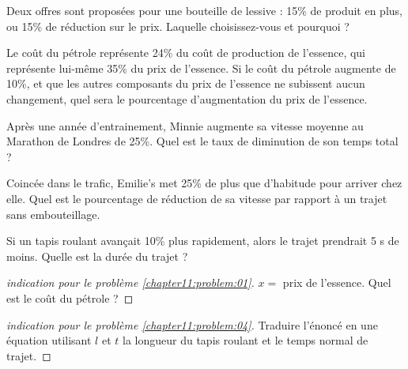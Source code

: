 \documentclass[main.tex]{subfiles}
\begin{document}
\begin{problem}  \hfill
	
	\noindent Deux offres sont proposées pour une bouteille de lessive : 15\% de produit en plus, ou 15\% de réduction sur le prix.	Laquelle choisissez-vous et pourquoi ?
\end{problem}
\begin{problem} \label{chapter11:problem:01}  \hfill
	
	\noindent	Le coût du pétrole représente 24\% du coût de production de l'essence, qui représente lui-même 35\% du prix de l'essence. Si le coût du pétrole augmente de 10\%, et que les autres composants du prix de l'essence ne subissent aucun changement, quel sera le pourcentage d'augmentation du prix de l'essence. 
\end{problem}
\begin{problem}\label{chapter11:problem:02} \hfill
	
	\noindent Après une année d'entrainement, Minnie augmente sa vitesse moyenne au  Marathon de Londres de 25\%. Quel est le taux de diminution de son temps total ?
\end{problem}
\begin{problem}\label{chapter11:problem:03}  \hfill
	
	\noindent Coincée dans le trafic, Emilie's met 25\% de plus que d'habitude pour arriver chez elle. Quel est le pourcentage de réduction de sa vitesse par rapport à un trajet sans embouteillage.
\end{problem}

\begin{problem} \label{chapter11:problem:04} \hfill
	
	\noindent	Si un tapis roulant avançait 10\% plus rapidement, alors le trajet prendrait 5 s de moins. Quelle est la durée du trajet ?
\end{problem}
\begin{proof}[indication pour le problème \ref{chapter11:problem:01}] $x=$ prix de l'essence. Quel est le coût du pétrole ? 
\end{proof} 
\begin{proof}[indication pour le  problème \ref{chapter11:problem:04}]    Traduire l'énoncé en une équation utilisant $l$ et $t$ la longueur du tapis roulant et le temps normal de trajet.
\end{proof}

%	 
\end{document}
